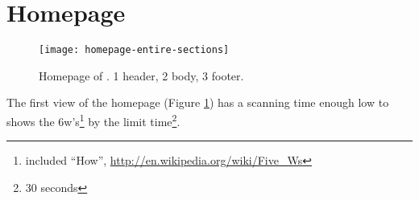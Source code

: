 \documentclass[
10pt, %
a4paper, %
oneside, %
headinclude,footinclude, %
BCOR5mm, %
]{scrartcl}
\begin{document}

\section{Homepage}
\label{homepage}

\begin{figure}[p]
\centering 
\centerline{\texttt{[image: homepage-entire-sections]}}
\caption[Homepage]{Homepage of \thesite{}. 1 header, 2 body, 3 footer.}
\label{fig:homepage} 
\end{figure}

The first view of the homepage (Figure \ref{fig:homepage}) has a scanning time enough low to shows the 6w's\footnote{included ``How'', \url{http://en.wikipedia.org/wiki/Five_Ws}} by the limit time\footnote{30 seconds}.
\end{document}
